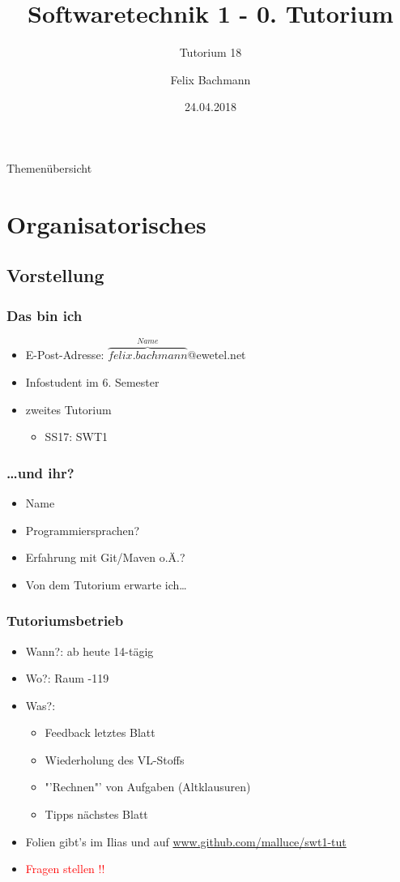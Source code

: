 \documentclass[18pt]{beamer}
\title[SWT1]{Softwaretechnik 1 - 0. Tutorium}
\subtitle{Tutorium 18}
\author{Felix Bachmann}
\date{24.04.2018}
\institute{KIT - Institut für Programmstrukturen und Datenorganisation (IPD)}
\begin{document}

\begin{frame}
\titlepage
\end{frame}

\begin{frame}{Themenübersicht}
\tableofcontents
\end{frame}

\section{Organisatorisches}
	\subsection{Vorstellung}
		\begin{frame}
			\frametitle{Das bin ich}
			\begin{itemize}
				\item E-Post-Adresse: $\overbrace{felix.bachmann}^{Name}$@ewetel.net 
				\item Infostudent im 6. Semester
				\item zweites Tutorium
				\begin{itemize}
					\item SS17: SWT1
				\end{itemize}
			\end{itemize}
		\end{frame}
		\begin{frame}
			\frametitle{\dots und ihr?}
			\begin{itemize}
				\item Name
				\item Programmiersprachen?
				\item Erfahrung mit Git/Maven o.Ä.?
				\item Von dem Tutorium erwarte ich\dots
			\end{itemize}
		\end{frame}
	
	\begin{frame}
		\frametitle{Tutoriumsbetrieb}
		\begin{itemize}
			\item Wann?: ab heute 14-tägig 
			\item Wo?: Raum -119
			\item Was?: 
			\pause
			\begin{itemize}
				\item Feedback letztes Blatt
				\item Wiederholung des VL-Stoffs
				\item "'Rechnen"' von Aufgaben (Altklausuren)
				\item Tipps nächstes Blatt
			\end{itemize}
		\pause
			\item Folien gibt's im Ilias und auf \url{www.github.com/malluce/swt1-tut}
			\pause
			\item \textcolor{red}{Fragen stellen !!}
		\end{itemize}
	\end{frame}
		
\end{document}
